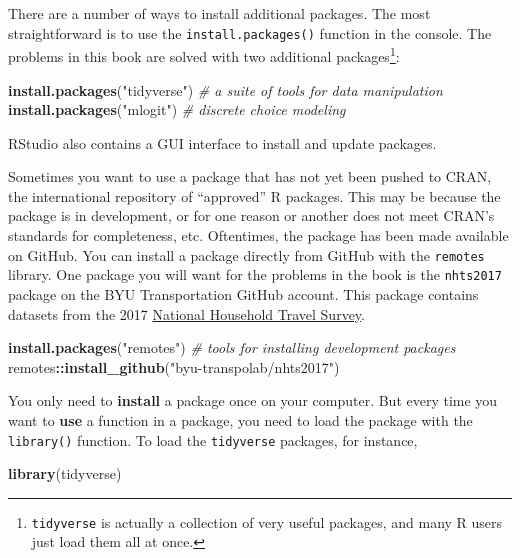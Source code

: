 \documentclass[
]{book}
\newenvironment{Shaded}{\begin{snugshade}}{\end{snugshade}}
\newcommand{\CommentTok}[1]{\textcolor[rgb]{0.56,0.35,0.01}{\textit{#1}}}
\newcommand{\KeywordTok}[1]{\textcolor[rgb]{0.13,0.29,0.53}{\textbf{#1}}}
\newcommand{\NormalTok}[1]{#1}
\newcommand{\OperatorTok}[1]{\textcolor[rgb]{0.81,0.36,0.00}{\textbf{#1}}}
\newcommand{\StringTok}[1]{\textcolor[rgb]{0.31,0.60,0.02}{#1}}
\begin{document}
There are a number of ways to install additional packages. The most straightforward
is to use the \texttt{install.packages()} function in the console. The problems
in this book are solved with two additional packages\footnote{\texttt{tidyverse} is actually a collection
  of very useful packages, and many R users just load them all at once.}:

\begin{Shaded}
\begin{Highlighting}[]
\KeywordTok{install.packages}\NormalTok{(}\StringTok{"tidyverse"}\NormalTok{) }\CommentTok{# a suite of tools for data manipulation}
\KeywordTok{install.packages}\NormalTok{(}\StringTok{"mlogit"}\NormalTok{) }\CommentTok{# discrete choice modeling}
\end{Highlighting}
\end{Shaded}

RStudio also contains a GUI interface to install and update packages.

Sometimes you want to use a package that has not yet been pushed to CRAN, the
international repository of ``approved'' R packages. This may be because the package
is in development, or for one reason or another does not meet CRAN's standards
for completeness, etc. Oftentimes, the package has been made available on GitHub.
You can install a package directly from GitHub with the \texttt{remotes} library. One
package you will want for the problems in the book is the \texttt{nhts2017} package
on the BYU Transportation GitHub account. This package contains datasets from the 2017
\href{https://nhts.ornl.gov/}{National Household Travel Survey}.

\begin{Shaded}
\begin{Highlighting}[]
\KeywordTok{install.packages}\NormalTok{(}\StringTok{"remotes"}\NormalTok{) }\CommentTok{# tools for installing development packages}
\NormalTok{remotes}\OperatorTok{::}\KeywordTok{install_github}\NormalTok{(}\StringTok{"byu-transpolab/nhts2017"}\NormalTok{)}
\end{Highlighting}
\end{Shaded}

You only need to \textbf{install} a package once on your computer. But every time you
want to \textbf{use} a function in a package, you need to load the package with the
\texttt{library()} function. To load the \texttt{tidyverse} packages, for instance,

\begin{Shaded}
\begin{Highlighting}[]
\KeywordTok{library}\NormalTok{(tidyverse)}
\end{Highlighting}
\end{Shaded}
\end{document}
